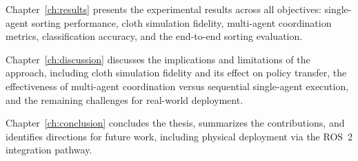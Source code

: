 Chapter~\ref{ch:results} presents the experimental results across all objectives: single-agent sorting performance, cloth simulation fidelity, multi-agent coordination metrics, classification accuracy, and the end-to-end sorting evaluation.

Chapter~\ref{ch:discussion} discusses the implications and limitations of the approach, including cloth simulation fidelity and its effect on policy transfer, the effectiveness of multi-agent coordination versus sequential single-agent execution, and the remaining challenges for real-world deployment.

Chapter~\ref{ch:conclusion} concludes the thesis, summarizes the contributions, and identifies directions for future work, including physical deployment via the \ac{ROS}~2 integration pathway.
